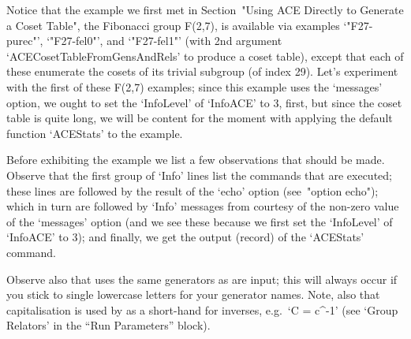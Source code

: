 Notice that the example we first met in Section~"Using ACE Directly to
Generate a Coset Table", the Fibonacci group F(2,7), is available  via
examples  `"F27-purec"',  `"F27-fel0"',  and  `"F27-fel1"'  (with  2nd
argument `ACECosetTableFromGensAndRels' to  produce  a  coset  table),
except that each of these enumerate the cosets of its trivial subgroup
(of index 29).  Let's  experiment  with  the  first  of  these  F(2,7)
examples; since this example uses the `messages' option, we  ought  to
set the `InfoLevel' of `InfoACE' to 3,  first,  but  since  the  coset
table is quite long, we will be content for the moment  with  applying
the default function `ACEStats' to the example.

Before exhibiting the example we list a few observations  that  should
be made. Observe that  the  first  group  of  `Info'  lines  list  the
commands that are executed; these lines are followed by the result  of
the `echo' option (see~"option echo"); which in turn are  followed  by
`Info' messages from {\ACE} courtesy of  the  non-zero  value  of  the
`messages'  option  (and  we  see  these  because  we  first  set  the
`InfoLevel' of `InfoACE'  to  3);  and  finally,  we  get  the  output
(record) of the `ACEStats' command.

Observe also that {\ACE} uses the same generators as  are input;  this
will always occur if you stick to single lowercase  letters  for  your
generator names. Note, also that capitalisation is used by {\ACE} as a
short-hand for inverses, e.g.~`C = c^-1' (see `Group Relators' in  the
{\ACE} ``Run Parameters'' block).

